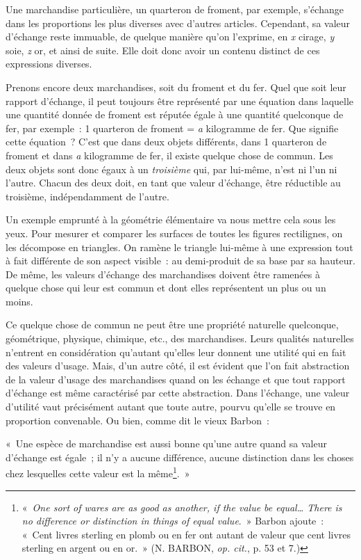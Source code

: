 \documentclass[french,twoside]{book} %
\begin{document}
Une marchandise particulière, un quarteron de froment, par exemple, s’échange dans les proportions les plus diverses avec d’autres articles. Cependant, sa valeur d’échange reste immuable, de quelque manière qu’on l’exprime, en \emph{x} cirage, \emph{y} soie, \emph{z} or, et ainsi de suite. Elle doit donc avoir un contenu distinct de ces expressions diverses.\par
Prenons encore deux marchandises, soit du froment et du fer. Quel que soit leur rapport d’échange, il peut toujours être représenté par une équation dans laquelle une quantité donnée de froment est réputée égale à une quantité quelconque de fer, par exemple : 1 quarteron de froment = \emph{a} kilogramme de fer. Que signifie cette équation ? C’est que dans deux objets différents, dans 1 quarteron de froment et dans \emph{a} kilogramme de fer, il existe quelque chose de commun. Les deux objets sont donc égaux à un \emph{troisième} qui, par lui-même, n’est ni l’un ni l’autre. Chacun des deux doit, en tant que valeur d’échange, être réductible au troisième, indépendamment de l’autre.\par
Un exemple emprunté à la géométrie élémentaire va nous mettre cela sous les yeux. Pour mesurer et comparer les surfaces de toutes les figures rectilignes, on les décompose en triangles. On ramène le triangle lui-même à une expression tout à fait différente de son aspect visible : au demi-produit de sa base par sa hauteur. De même, les valeurs d’échange des marchandises doivent être ramenées à quelque chose qui leur est commun et dont elles représentent un plus ou un moins.\par
Ce quelque chose de commun ne peut être une propriété naturelle quelconque, géométrique, physique, chimique, etc., des marchandises. Leurs qualités naturelles n’entrent en considération qu’autant qu’elles leur donnent une utilité qui en fait des valeurs d’usage. Mais, d’un autre côté, il est évident que l’on fait abstraction de la valeur d’usage des marchandises quand on les échange et que tout rapport d’échange est même caractérisé par cette abstraction. Dans l’échange, une valeur d’utilité vaut précisément autant que toute autre, pourvu qu’elle se trouve en proportion convenable. Ou bien, comme dit le vieux Barbon :\par
« Une espèce de marchandise est aussi bonne qu’une autre quand sa valeur d’échange est égale ; il n’y a aucune différence, aucune distinction dans les choses chez lesquelles cette valeur est la même\footnote{« \emph{One sort of wares are as good as another, if the value be equal… There is no difference or distinction in things of equal value}. » Barbon ajoute : « Cent livres sterling en plomb ou en fer ont autant de valeur que cent livres sterling en argent ou en or. » (N. BARBON, \emph{op. cit.}, p. 53 et 7.)}. »\par
\end{document}
